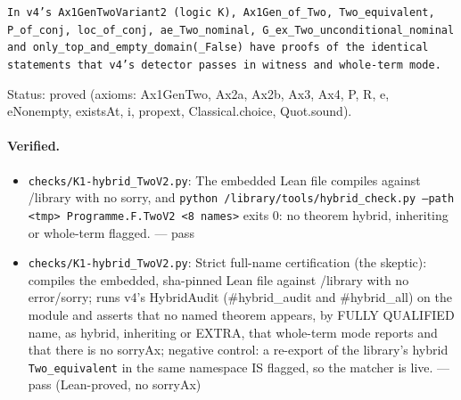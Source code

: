 \documentclass{article}
\begin{document}
\texttt{In v4's Ax1GenTwoVariant2 (logic K), Ax1Gen\_of\_Two, Two\_equivalent, P\_of\_conj, loc\_of\_conj, ae\_Two\_nominal, G\_ex\_Two\_unconditional\_nominal and only\_top\_and\_empty\_domain(\_False) have proofs of the identical statements that v4's detector passes in witness and whole-term mode.}

Status: proved (axioms: Ax1GenTwo, Ax2a, Ax2b, Ax3, Ax4, P, R, e, eNonempty, existsAt, i, propext, Classical.choice, Quot.sound).

\paragraph{Verified.}
\begin{itemize}
\item \texttt{checks/K1-hybrid\_TwoV2.py}: The embedded Lean file compiles against /library with no sorry, and \texttt{python /library/tools/hybrid\_check.py --path \textless{}tmp\textgreater{} Programme.F.TwoV2 \textless{}8 names\textgreater{}} exits 0: no theorem hybrid, inheriting or whole-term flagged. --- pass
\item \texttt{checks/K1-hybrid\_TwoV2.py}: Strict full-name certification (the skeptic): compiles the embedded, sha-pinned Lean file against /library with no error/sorry; runs v4's HybridAudit (\#hybrid\_audit and \#hybrid\_all) on the module and asserts that no named theorem appears, by FULLY QUALIFIED name, as hybrid, inheriting or EXTRA, that whole-term mode reports and that there is no sorryAx; negative control: a re-export of the library's hybrid \texttt{Two\_equivalent} in the same namespace IS flagged, so the matcher is live. --- pass (Lean-proved, no sorryAx)
\end{itemize}
\end{document}
